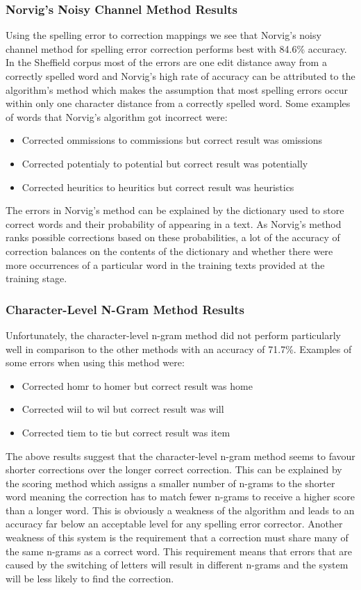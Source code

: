\subsubsection{Norvig's Noisy Channel Method Results}
Using the spelling error to correction mappings we see that Norvig's noisy channel method for spelling error correction performs best with 84.6\% accuracy. In the Sheffield corpus most of the errors are one edit distance away from a correctly spelled word and Norvig's high rate of accuracy can be attributed to the algorithm's method which makes the assumption that most spelling errors occur within only one character distance from a correctly spelled word. Some examples of words that Norvig's algorithm got incorrect were:
\begin{itemize}
\item Corrected ommissions to commissions but correct result was omissions
\item Corrected potentialy to potential but correct result was potentially
\item Corrected heuritics to heuritics but correct result was heuristics
\end{itemize}
The errors in Norvig's method can be explained by the dictionary used to store correct words and their probability of appearing in a text. As Norvig's method ranks possible corrections based on these probabilities, a lot of the accuracy of correction balances on the contents of the dictionary and whether there were more occurrences of a particular word in the training texts provided at the training stage.

\subsubsection{Character-Level N-Gram Method Results}
Unfortunately, the character-level n-gram method did not perform particularly well in comparison to the other methods with an accuracy of 71.7\%. Examples of some errors when using this method were:
\begin{itemize}
\item Corrected homr to homer but correct result was home
\item Corrected wiil to wil but correct result was will
\item Corrected tiem to tie but correct result was item
\end{itemize}
The above results suggest that the character-level n-gram method seems to favour shorter corrections over the longer correct correction. This can be explained by the scoring method which assigns a smaller number of n-grams to the shorter word meaning the correction has to match fewer n-grams to receive a higher score than a longer word. This is obviously a weakness of the algorithm and leads to an accuracy far below an acceptable level for any spelling error corrector. Another weakness of this system is the requirement that a correction must share many of the same n-grams as a correct word. This requirement means that errors that are caused by the switching of letters will result in different n-grams and the system will be less likely to find the correction.

